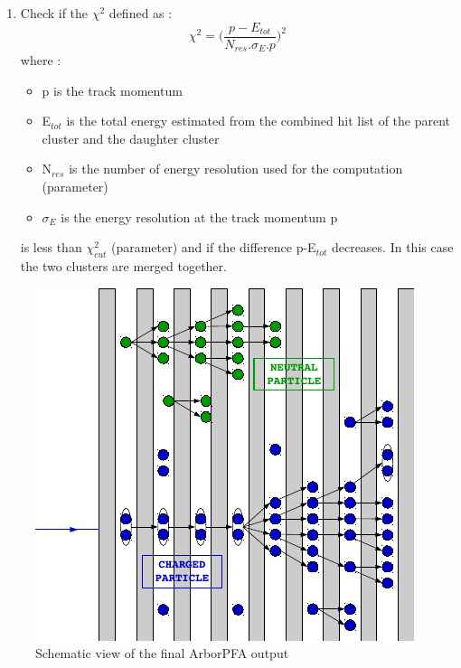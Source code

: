 \documentclass[cits]{JINST}
\begin{document}
\begin{enumerate}
  \item Check if the $\chi^2$ defined as :
  \begin{equation}
    \chi^2 = \Big( \frac{p-E_{tot}}{N_{res} . \sigma_E . p} \Big)^2
  \end{equation}
  where :
  \begin{itemize}
    \item p is the track momentum
    \item E$_{tot}$ is the total energy estimated from the combined hit list of the parent cluster and the daughter cluster
    \item N$_{res}$ is the number of energy resolution used for the computation (parameter)
    \item $\sigma_E$ is the energy resolution at the track momentum p 
  \end{itemize}
  is less than $\chi^2_{cut}$ (parameter) and if the difference p-E$_{tot}$ decreases. In this case the two clusters are merged together.
\end{enumerate}

\begin{figure}
  \vspace{-20pt}
  \begin{center}
    \includegraphics[width=\linewidth]{PfoCreation.pdf}
  \end{center}
  \vspace{-10pt}
  \caption{\label{ARBOR_PFO_CREATION} Schematic view of the final ArborPFA output}
  \vspace{-20pt}
\end{figure}
\end{document}
